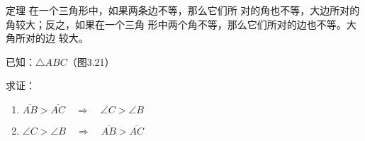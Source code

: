\begin{Theorem}{定理}
 在一个三角形中，如果两条边不等，那么它们所
对的角也不等，大边所对的角较大；反之，如果在一个三角
形中两个角不等，那么它们所对的边也不等。大角所对的边
较大。
\end{Theorem}

已知：$\triangle ABC$（图3.21）

\begin{figure}
    \begin{minipage}[t]{0.48\linewidth}
    \centering
\begin{tikzpicture}[>=latex, scale=1.3]
    \end{tikzpicture}
    \caption{}
    \end{minipage}
    \begin{minipage}[t]{0.48\linewidth}
    \centering
    \begin{tikzpicture}[>=latex, scale=1.3]
    \end{tikzpicture}
    \caption{}
    \end{minipage}
    \end{figure}

求证：
\begin{enumerate}
    \item $\overline{AB}>\overline{AC}\quad \Rightarrow\quad \angle C>\angle B$
    \item $\angle C>\angle B\quad \Rightarrow\quad \overline{AB}>\overline{AC}$
\end{enumerate}

